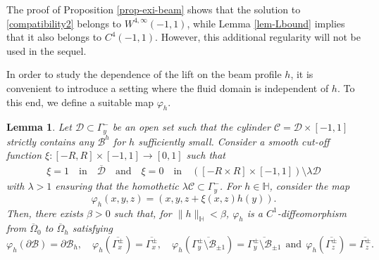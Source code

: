 \documentclass[11pt,a4paper]{amsart}
\newtheorem{lemma}[proposition]{Lemma}
\theoremstyle{remark}
\theoremstyle{definition}
\numberwithin{equation}{section}
\numberwithin{proposition}{section}
\begin{document}
The proof of Proposition \ref{prop-exi-beam}  shows that the solution to \eqref{compatibility2}  belongs to $W^{4, \infty} (-1,1)$, while Lemma \ref{lem-Lbound} implies that it also belongs to $C^4(-1,1)$. However, this additional regularity will not be used in the sequel.\par




In order to study the dependence of the lift on the beam profile $h$, it is convenient to introduce a setting where the fluid domain is independent of $h$. To this end, we define a suitable map $\varphi_h$.
\begin{lemma}\label{lemma-diffeo}
Let $\mathcal{D}\subset \Gamma_y^-$ be an open set such that the cylinder $\mathcal{C}=\mathcal{D} \times [-1,1]$ strictly contains any $\mathcal{B}^h$ for $h$ sufficiently small. Consider a smooth cut-off function $\xi:[-R, R]\times [-1,1]\rightarrow [0,1]$ such that
\begin{equation}\label{cutoff-diffeo}\begin{aligned}\xi=1\quad  \text{in} \quad \overline{\mathcal{D}} \quad \text{and} \quad
\xi=0 \quad \text{in}\quad \left([-R\times R]\times [-1,1]\right)\setminus \lambda\mathcal{D}
    \end{aligned}
\end{equation}with $\lambda>1$ ensuring that the homothetic $\lambda \mathcal{C}\subset \Gamma_y^-$.
For $h\in \mathbb{H}$, consider the map
	\begin{equation}\label{diffeo}\varphi_h (x,y,z)= \left(x, y, z+ \xi(x,z)h(y)\right).\end{equation} Then, there exists $\beta>0$ such that, for $\|h\|_{\mathbb{H}}<\beta$,  $\varphi_h$ is a $C^1$-diffeomorphism from $\overline{\Omega}_0$ to $\overline{\Omega}_h$ satisfying \begin{equation}\label{diff-prop}
			\varphi_h (\partial\mathcal{B})=\partial\mathcal{B}_h , \quad \varphi_h (\overline{\Gamma_x^\pm })=\overline{\Gamma_x^\pm},
           \quad \varphi_h (\overline{\Gamma_y^\pm \setminus \mathcal{B}_{\pm 1} })=\overline{\Gamma_y^\pm \setminus \mathcal{B}_{\pm 1} } \ \
              \text{and} \ \ \varphi_h (\overline{\Gamma_z^\pm })=\overline{\Gamma_z^\pm}.
            \end{equation}
\end{lemma}
\end{document}
